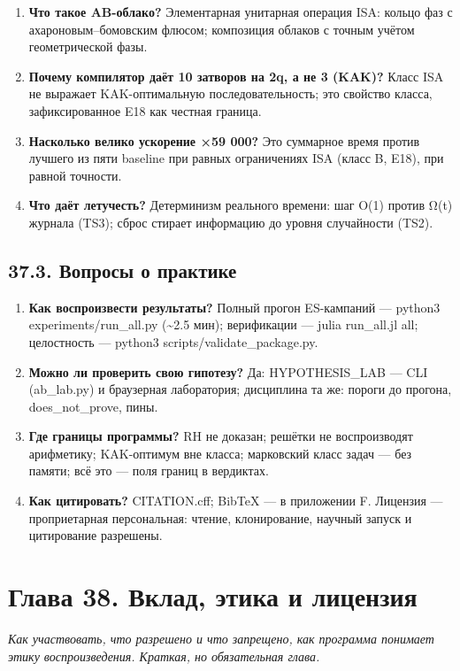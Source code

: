 \documentclass[11pt,a4paper]{article}
\begin{document}
\begin{enumerate}
  \item \textbf{Что такое AB-облако?} Элементарная унитарная операция ISA: кольцо фаз с ахароновым–бомовским флюсом; композиция облаков с точным учётом геометрической фазы.
  \item \textbf{Почему компилятор даёт 10 затворов на 2q, а не 3 (KAK)?} Класс ISA не выражает KAK-оптимальную последовательность; это свойство класса, зафиксированное E18 как честная граница.
  \item \textbf{Насколько велико ускорение ×59 000?} Это суммарное время против лучшего из пяти baseline при равных ограничениях ISA (класс B, E18), при равной точности.
  \item \textbf{Что даёт летучесть?} Детерминизм реального времени: шаг O(1) против Ω(t) журнала (TS3); сброс стирает информацию до уровня случайности (TS2).
\end{enumerate}

\subsection{37.3. Вопросы о практике}

\begin{enumerate}
  \item \textbf{Как воспроизвести результаты?} Полный прогон ES-кампаний — python3 experiments/run\_all.py (\textasciitilde{}2.5 мин); верификации — julia run\_all.jl all; целостность — python3 scripts/validate\_package.py.
  \item \textbf{Можно ли проверить свою гипотезу?} Да: HYPOTHESIS\_LAB — CLI (ab\_lab.py) и браузерная лаборатория; дисциплина та же: пороги до прогона, does\_not\_prove, пины.
  \item \textbf{Где границы программы?} RH не доказан; решётки не воспроизводят арифметику; KAK-оптимум вне класса; марковский класс задач — без памяти; всё это — поля границ в вердиктах.
  \item \textbf{Как цитировать?} CITATION.cff; BibTeX — в приложении F. Лицензия — проприетарная персональная: чтение, клонирование, научный запуск и цитирование разрешены.
\end{enumerate}

\section{Глава 38. Вклад, этика и лицензия}

\noindent\textit{\color{copper}Как участвовать, что разрешено и что запрещено, как программа понимает этику воспроизведения. Краткая, но обязательная глава.}
\end{document}
